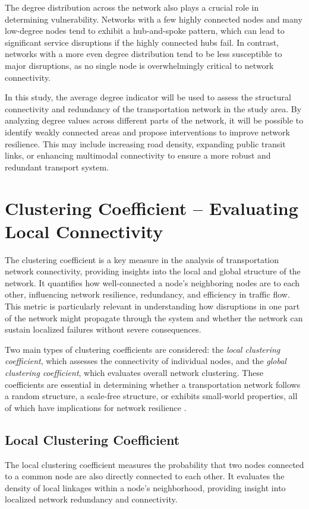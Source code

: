 The degree distribution across the network also plays a crucial role in determining vulnerability. Networks with a few highly connected nodes and many low-degree nodes tend to exhibit a hub-and-spoke pattern, which can lead to significant service disruptions if the highly connected hubs fail. In contrast, networks with a more even degree distribution tend to be less susceptible to major disruptions, as no single node is overwhelmingly critical to network connectivity.

In this study, the average degree indicator will be used to assess the structural connectivity and redundancy of the transportation network in the study area. By analyzing degree values across different parts of the network, it will be possible to identify weakly connected areas and propose interventions to improve network resilience. This may include increasing road density, expanding public transit links, or enhancing multimodal connectivity to ensure a more robust and redundant transport system.

\section{Clustering Coefficient – Evaluating Local Connectivity}
The clustering coefficient is a key measure in the analysis of transportation network connectivity, providing insights into the local and global structure of the network. It quantifies how well-connected a node’s neighboring nodes are to each other, influencing network resilience, redundancy, and efficiency in traffic flow. This metric is particularly relevant in understanding how disruptions in one part of the network might propagate through the system and whether the network can sustain localized failures without severe consequences.

Two main types of clustering coefficients are considered: the \textit{local clustering coefficient}, which assesses the connectivity of individual nodes, and the \textit{global clustering coefficient}, which evaluates overall network clustering. These coefficients are essential in determining whether a transportation network follows a random structure, a scale-free structure, or exhibits small-world properties, all of which have implications for network resilience \cite{taylor2017}.

\subsection{Local Clustering Coefficient}
The local clustering coefficient measures the probability that two nodes connected to a common node are also directly connected to each other. It evaluates the density of local linkages within a node’s neighborhood, providing insight into localized network redundancy and connectivity.


